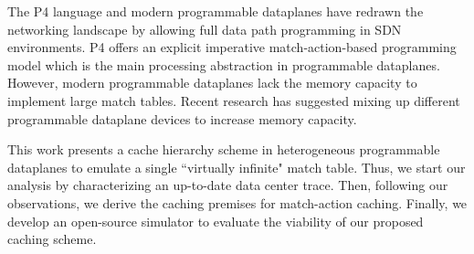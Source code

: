 The P4 language and modern programmable dataplanes have redrawn the networking landscape by allowing full data path programming in SDN environments.
P4 offers an explicit imperative match-action-based programming model which is the main processing abstraction in programmable dataplanes.
However, modern programmable dataplanes lack the memory capacity to implement large match tables.
Recent research has suggested mixing up different programmable dataplane devices to increase memory capacity.

This work presents a cache hierarchy scheme in heterogeneous programmable dataplanes to emulate a single ``virtually infinite" match table.
Thus, we start our analysis by characterizing an up-to-date data center trace.
Then, following our observations, we derive the caching premises for match-action caching.
Finally, we develop an open-source simulator to evaluate the viability of our proposed caching scheme.